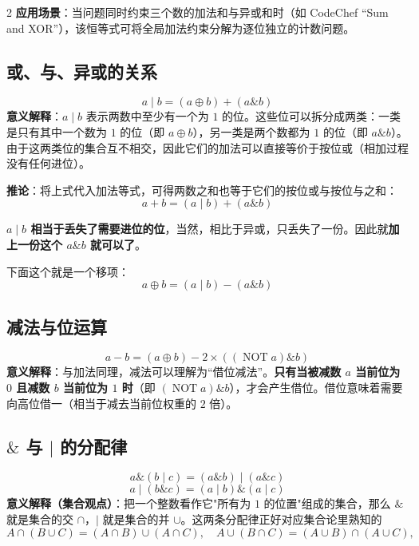 \begin{multicols*}{2}
		\textbf{应用场景}：当问题同时约束三个数的加法和与异或和时（如 CodeChef ``Sum and XOR''），该恒等式可将全局加法约束分解为逐位独立的计数问题。

		\subsection{或、与、异或的关系}
		$$a \mathbin{|} b = (a \oplus b) + (a \mathbin{\&} b)$$
		\textbf{意义解释}：$a \mathbin{|} b$ 表示两数中至少有一个为 $1$ 的位。这些位可以拆分成两类：一类是只有其中一个数为 $1$ 的位（即 $a \oplus b$），另一类是两个数都为 $1$ 的位（即 $a \mathbin{\&} b$）。由于这两类位的集合互不相交，因此它们的加法可以直接等价于按位或（相加过程没有任何进位）。

		\textbf{推论}：将上式代入加法等式，可得两数之和也等于它们的按位或与按位与之和：
		$$a + b = (a \mathbin{|} b) + (a \mathbin{\&} b)$$

		\textbf{$a \mathbin{|} b$ 相当于丢失了需要进位的位}，当然，相比于异或，只丢失了一份。因此就\textbf{加上一份这个 $a \mathbin{\&} b$ 就可以了}。

		下面这个就是一个移项：
		$$a \oplus b = (a \mathbin{|} b) - (a \mathbin{\&} b)$$

		\subsection{减法与位运算}
		$$a - b = (a \oplus b) - 2 \times ((\operatorname{NOT} a) \mathbin{\&} b)$$
		\textbf{意义解释}：与加法同理，减法可以理解为“借位减法”。\textbf{只有当被减数 $a$ 当前位为 $0$ 且减数 $b$ 当前位为 $1$ 时}（即 $(\operatorname{NOT} a) \mathbin{\&} b$），才会产生借位。借位意味着需要向高位借一（相当于减去当前位权重的 $2$ 倍）。

		\subsection{\texorpdfstring{$\mathbin{\&}$ 与 $\mathbin{|}$}{\& 与 |} 的分配律}
		$$a \mathbin{\&} (b \mathbin{|} c) = (a \mathbin{\&} b) \mathbin{|} (a \mathbin{\&} c)$$
		$$a \mathbin{|} (b \mathbin{\&} c) = (a \mathbin{|} b) \mathbin{\&} (a \mathbin{|} c)$$
		\textbf{意义解释（集合观点）}：把一个整数看作它"所有为 $1$ 的位置"组成的集合，那么 $\mathbin{\&}$ 就是集合的交 $\cap$，$\mathbin{|}$ 就是集合的并 $\cup$。这两条分配律正好对应集合论里熟知的
		$$A \cap (B \cup C) = (A \cap B) \cup (A \cap C), \quad A \cup (B \cap C) = (A \cup B) \cap (A \cup C),$$


\end{multicols*}

